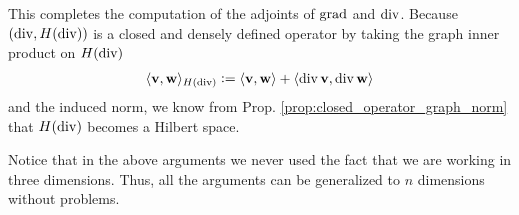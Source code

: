 \documentclass[../master_thesis.tex]{subfiles}
\begin{document}


This completes the computation of the adjoints of $\operatorname{grad}$ and $\operatorname{div}$. Because  
$(\operatorname{div}, H(\operatorname{div}))$ is a closed and densely defined operator 
by taking the graph inner product on $H(\operatorname{div})$
\begin{align*}
    \langle \mathbf{v}, \mathbf{w} \rangle _{H(\operatorname{div})}
    \vcentcolon= \langle \mathbf{v}, \mathbf{w} \rangle + \langle \operatorname{div} \mathbf{v}, \operatorname{div} \mathbf{w} \rangle
\end{align*}
and the induced norm,
we know from Prop. \ref{prop:closed_operator_graph_norm} that $H(\operatorname{div})$ becomes a Hilbert space.

\begin{remark}
    Notice that in the above arguments 
    we never used the fact that we are working in three dimensions. Thus, 
    all the arguments can be generalized to $n$ dimensions without problems.
\end{remark}
\end{document}
